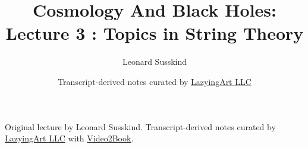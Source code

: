\documentclass[11pt,oneside]{book}
\begin{document}
\frontmatter
\title{Cosmology And Black Holes: Lecture 3 : Topics in String Theory}
\author{Leonard Susskind}
\date{Transcript-derived notes curated by \href{https://lazying.art}{LazyingArt LLC}}
\maketitle
\begin{center}
\small Original lecture by Leonard Susskind. Transcript-derived notes curated by \href{https://lazying.art}{LazyingArt LLC} with \href{https://github.com/lachlanchen/Video2Book}{Video2Book}.
\end{center}
\clearpage
\mainmatter

\end{document}

